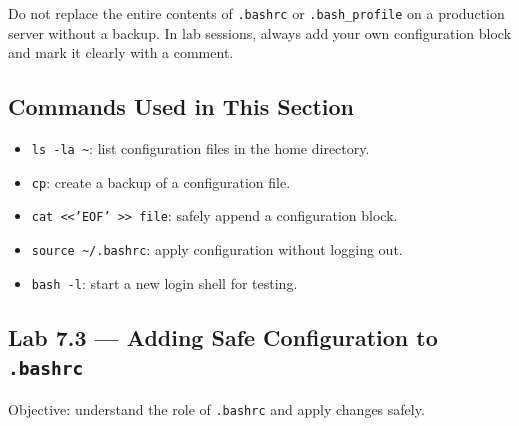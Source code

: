\begin{notebox}
Do not replace the entire contents of \texttt{.bashrc} or
\texttt{.bash\_profile} on a production server without a backup. In lab
sessions, always add your own configuration block and mark it clearly with a
comment.
\end{notebox}

\subsection*{Commands Used in This Section}

\begin{itemize}
  \item \texttt{ls -la \textasciitilde}: list configuration files in the home directory.
  \item \texttt{cp}: create a backup of a configuration file.
  \item \texttt{cat <<'EOF' >> file}: safely append a configuration block.
  \item \texttt{source \textasciitilde/.bashrc}: apply configuration without logging out.
  \item \texttt{bash -l}: start a new login shell for testing.
\end{itemize}

\subsection*{Lab 7.3 --- Adding Safe Configuration to \texttt{.bashrc}}

Objective: understand the role of \texttt{.bashrc} and apply changes safely.


